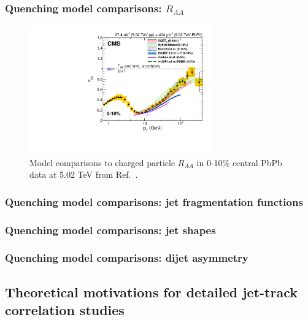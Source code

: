 \subsubsection{Quenching model comparisons: $R_{AA}$}

\begin{figure}[hbtp]
\begin{center}
\includegraphics[width=0.7\textwidth]{figures/Theory/ChPart_Raa_CMS_Theory.pdf}
\caption[Model comparisons to charged particle $R_{AA}$ at 5.02 TeV]{Model comparisons to charged particle $R_{AA}$ in 0-10\% central PbPb data at 5.02 TeV from Ref.~\cite{Khachatryan:2016odn}.}
\label{fig:cms_chpart_raa_theory}
\end{center}
\end{figure}



\subsubsection{Quenching model comparisons: jet fragmentation functions}

\subsubsection{Quenching model comparisons: jet shapes}

\subsubsection{Quenching model comparisons: dijet asymmetry}
  
  
  
 \subsection{Theoretical motivations for detailed jet-track correlation studies}
 \label{sec:motivation}
 
